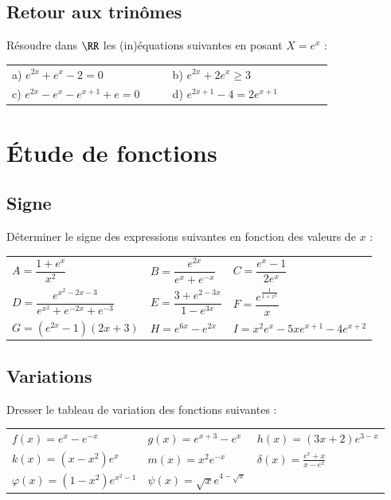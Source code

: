 \documentclass[oneside,12pt]{article}          %
\begin{document}
\subsection{Retour aux trinômes}
Résoudre dans $\RR$ les (in)équations suivantes en posant $X=e^{x}$ :

\begin{tabular}{p{0.4\linewidth}p{0.4\linewidth}}
    a) $e^{2x}+e^{x}-2 = 0$ & b) $e^{2x}+2e^{x}\ge3$ \\
    c) $e^{2x}-e^{x}-e^{x+1}+e=0$ & d) $e^{2x+1}-4=2e^{x+1}$
\end{tabular}



\section{Étude de fonctions}

\subsection{Signe}
Déterminer le signe des expressions suivantes en fonction des valeurs de $x$ :

\renewcommand{\arraystretch}{2.4}
\begin{tabular}{p{} p{} p{}}
     $A=\dfrac{1+e^{x}}{x^{2}}$ & $B=\dfrac{e^{2x}}{e^{x}+e^{-x}}$ & $C=\dfrac{e^{x}-1}{2e^{x}}$ \\
     $D=\dfrac{e^{x^{2}-2x-3}}{e^{x^{2}}+e^{-2x}+e^{-3}}$ & $E=\dfrac{3+e^{2-3x}}{1-e^{3x}}$ & $F=
     \dfrac{e^{\frac{1}{1+x^{2}}}}{x}$\\
     $G = \left(e^{2x}-1\right)(2x+3)$ & $H = e^{6x}-e^{2x}$ & $I = x^2e^x-5xe^{x+1}-4e^{x+2}$
\end{tabular}



\subsection{Variations}
Dresser le tableau de variation des fonctions suivantes :

\renewcommand{\arraystretch}{1.3}
\begin{tabular}{p{} p{} p{}}
    $f(x)=e^{x}-e^{-x}$ & $g(x)=e^{x+3}-e^{x}$ & $h(x)=(3x+2)e^{3-x}$ \\
    $k(x)=(x-x^{2})e^{x}$ & $m(x)=x^{2}e^{-x}$ & $\delta(x)=\frac{e^{x}+x}{x-e^{x}}$ \\
    $\varphi(x)=(1-x^2)e^{x^2-1}$ & $\psi(x)=\sqrt{x}e^{4-\sqrt{x}}$ \\
\end{tabular}
\end{document}
